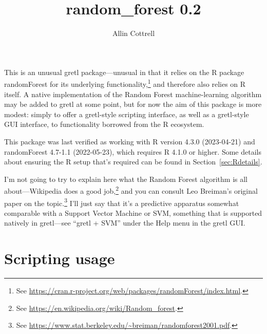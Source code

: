 \documentclass{article}
\begin{document}
\setlength{\parindent}{0pt}
\setlength{\parskip}{1ex}

\title{random\_forest 0.2} \author{Allin Cottrell}
\maketitle

This is an unusual gretl package---unusual in that it relies on the
\textsf{R} package \textsf{randomForest} for its underlying
functionality,\footnote{See
  \url{https://cran.r-project.org/web/packages/randomForest/index.html}.}
and therefore also relies on \textsf{R} itself. A native
implementation of the Random Forest machine-learning algorithm may be
added to gretl at some point, but for now the aim of this package is
more modest: simply to offer a gretl-style scripting interface, as
well as a gretl-style GUI interface, to functionality borrowed from
the \textsf{R} ecosystem.

This package was last verified as working with \textsf{R} version
4.3.0 (2023-04-21) and \textsf{randomForest} 4.7-1.1 (2022-05-23),
which requires \textsf{R} 4.1.0 or higher. Some details about ensuring
the \textsf{R} setup that's required can be found in
Section~\ref{sec:Rdetails}.

I'm not going to try to explain here what the Random Forest algorithm
is all about---Wikipedia does a good job,\footnote{See
  \url{https://en.wikipedia.org/wiki/Random_forest}.} and you can
consult Leo Breiman's original paper on the topic.\footnote{See
  \url{https://www.stat.berkeley.edu/~breiman/randomforest2001.pdf}.}
I'll just say that it's a predictive apparatus somewhat comparable
with a Support Vector Machine or SVM, something that is supported
natively in gretl---see ``gretl + SVM'' under the \textsf{Help} menu
in the gretl GUI.

\section{Scripting usage}
\end{document}
